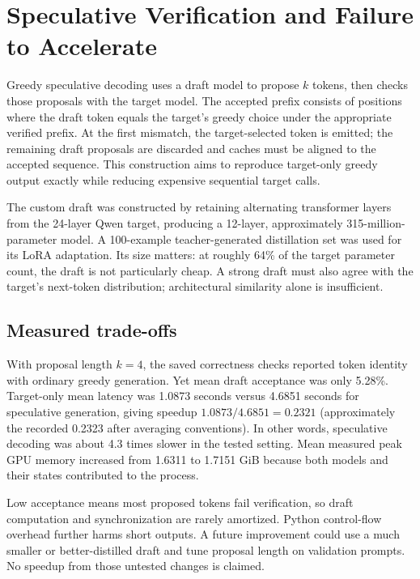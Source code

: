 \documentclass[conference]{IEEEtran}
\begin{document}
\section{Speculative Verification and Failure to Accelerate}
Greedy speculative decoding uses a draft model to propose $k$ tokens, then checks those proposals with the target model. The accepted prefix consists of positions where the draft token equals the target's greedy choice under the appropriate verified prefix. At the first mismatch, the target-selected token is emitted; the remaining draft proposals are discarded and caches must be aligned to the accepted sequence. This construction aims to reproduce target-only greedy output exactly while reducing expensive sequential target calls.

The custom draft was constructed by retaining alternating transformer layers from the 24-layer Qwen target, producing a 12-layer, approximately 315-million-parameter model. A 100-example teacher-generated distillation set was used for its LoRA adaptation. Its size matters: at roughly 64\% of the target parameter count, the draft is not particularly cheap. A strong draft must also agree with the target's next-token distribution; architectural similarity alone is insufficient.

\subsection{Measured trade-offs}
With proposal length $k=4$, the saved correctness checks reported token identity with ordinary greedy generation. Yet mean draft acceptance was only 5.28\%. Target-only mean latency was 1.0873 seconds versus 4.6851 seconds for speculative generation, giving speedup $1.0873/4.6851=0.2321$ (approximately the recorded 0.2323 after averaging conventions). In other words, speculative decoding was about 4.3 times slower in the tested setting. Mean measured peak GPU memory increased from 1.6311 to 1.7151 GiB because both models and their states contributed to the process.

Low acceptance means most proposed tokens fail verification, so draft computation and synchronization are rarely amortized. Python control-flow overhead further harms short outputs. A future improvement could use a much smaller or better-distilled draft and tune proposal length on validation prompts. No speedup from those untested changes is claimed.
\end{document}
